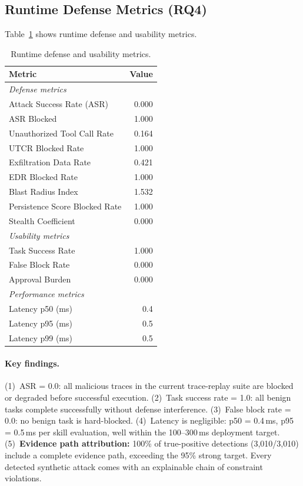 \documentclass[10pt]{article}
\begin{document}
\subsection{Runtime Defense Metrics (RQ4)}

Table~\ref{tab:runtime} shows runtime defense and usability metrics.

\begin{table}[t]
\centering
\caption{Runtime defense and usability metrics.}
\label{tab:runtime}
\begin{tabular}{lr}
\toprule
Metric & Value \\
\midrule
\multicolumn{2}{l}{\textit{Defense metrics}} \\
Attack Success Rate (ASR) & 0.000 \\
ASR Blocked & 1.000 \\
Unauthorized Tool Call Rate & 0.164 \\
UTCR Blocked Rate & 1.000 \\
Exfiltration Data Rate & 0.421 \\
EDR Blocked Rate & 1.000 \\
Blast Radius Index & 1.532 \\
Persistence Score Blocked Rate & 1.000 \\
Stealth Coefficient & 0.000 \\
\midrule
\multicolumn{2}{l}{\textit{Usability metrics}} \\
Task Success Rate & 1.000 \\
False Block Rate & 0.000 \\
Approval Burden & 0.000 \\
\midrule
\multicolumn{2}{l}{\textit{Performance metrics}} \\
Latency p50 (ms) & 0.4 \\
Latency p95 (ms) & 0.5 \\
Latency p99 (ms) & 0.5 \\
\bottomrule
\end{tabular}
\end{table}

\paragraph{Key findings.}
(1)~ASR = 0.0: all malicious traces in the current trace-replay suite are blocked or degraded before successful execution.
(2)~Task success rate = 1.0: all benign tasks complete successfully without defense interference.
(3)~False block rate = 0.0: no benign task is hard-blocked.
(4)~Latency is negligible: p50 = 0.4\,ms, p95 = 0.5\,ms per skill evaluation, well within the 100--300\,ms deployment target.
(5)~\textbf{Evidence path attribution:} 100\% of true-positive detections (3{,}010/3{,}010) include a complete evidence path, exceeding the 95\% strong target. Every detected synthetic attack comes with an explainable chain of constraint violations.
\end{document}
